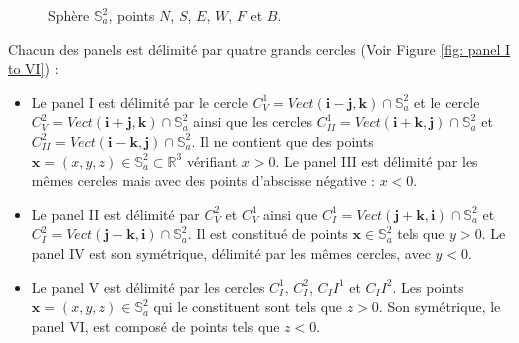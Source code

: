\begin{figure}[ht]
\begin{center}
\end{center}
\caption{Sphère $\mathbb{S}_a^2$, points $N$, $S$, $E$, $W$, $F$ et $B$.}
\label{fig: sphere NSEWFB}
\end{figure}


Chacun des panels est délimité par quatre grands cercles (Voir Figure \ref{fig: panel I to VI}) :

\begin{itemize}
\item Le panel I est délimité par le cercle $C_V^1 = Vect(\mathbf{i}-\mathbf{j}, \mathbf{k}) \cap \mathbb{S}_a^2$ et le cercle $C_V^2 = Vect(\mathbf{i}+\mathbf{j}, \mathbf{k}) \cap \mathbb{S}_a^2$ ainsi que les cercles $C_{II}^1 = Vect(\mathbf{i}+\mathbf{k}, \mathbf{j}) \cap \mathbb{S}_a^2$ et $C_{II}^2 = Vect(\mathbf{i}-\mathbf{k}, \mathbf{j}) \cap \mathbb{S}_a^2$. Il ne contient que des points $\mathbf{x}=(x,y,z) \in \mathbb{S}_a^2 \subset \mathbb{R}^3$ vérifiant $x>0$. Le panel III est délimité par les mêmes cercles mais avec des points d'abscisse négative : $x<0$.
\item Le panel II est délimité par $C_V^2$ et $C_V^1$ ainsi que $C_I^1=Vect(\mathbf{j}+\mathbf{k},\mathbf{i}) \cap \mathbb{S}_a^2$ et $C_I^2=Vect(\mathbf{j}-\mathbf{k},\mathbf{i}) \cap \mathbb{S}_a^2$. Il est constitué de points $\mathbf{x} \in \mathbb{S}_a^2$ tels que $y>0$. Le panel IV est son symétrique, délimité par les mêmes cercles, avec $y<0$.
\item Le panel V est délimité par les cercles $C_I^1$, $C_I^2$, $C_II^1$ et $C_II^2$. Les points $\mathbf{x} = (x,y,z) \in \mathbb{S}_a^2$ qui le constituent sont tels que $z>0$. Son symétrique, le panel VI, est composé de points tels que $z<0$.
\end{itemize}

